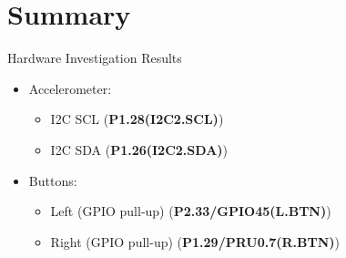 \section{Summary}

\begin{frame}
	{Hardware Investigation Results}
	\begin{itemize}
		\item
			Accelerometer:
		\begin{itemize}
		\item
			I2C SCL (\textbf{P1.28(I2C2.SCL)})
		\item
			I2C SDA (\textbf{P1.26(I2C2.SDA)})
		\end{itemize}
		\item
			Buttons:
		\begin{itemize}
		\item
			Left (GPIO pull-up) (\textbf{P2.33/GPIO45(L.BTN)})
		\item
			Right (GPIO pull-up) (\textbf{P1.29/PRU0.7(R.BTN)})
		\end{itemize}
	\end{itemize}
\end{frame}


